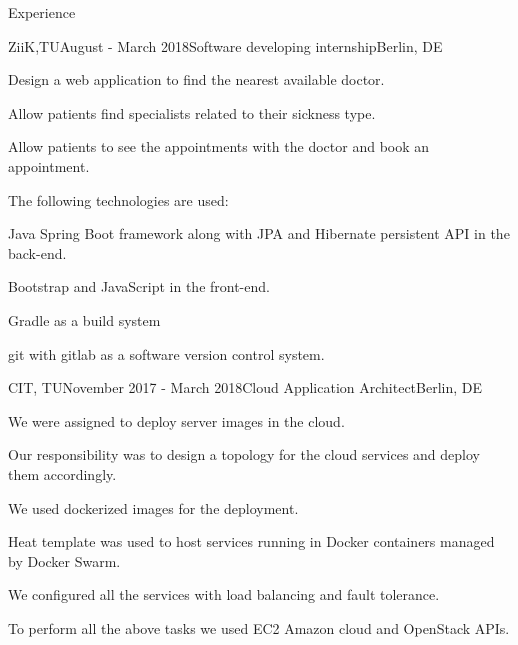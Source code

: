 \documentclass{resume} %
\begin{document}
\begin{rSection}{Experience}




\begin{rSubsection}{ZiiK,TU}{August  - March 2018}{Software developing internship}{Berlin, DE}
\item Design a web application to find the nearest available doctor.
\item Allow patients find specialists related to their sickness type.
\item Allow patients to see the appointments with the doctor and book an appointment.
\item The following technologies are used: 
\item Java Spring Boot framework along with JPA and Hibernate persistent API in the back-end.
\item Bootstrap and JavaScript in the front-end.
\item Gradle as a build system
\item git with gitlab as a software version control system.
\end{rSubsection}

\begin{rSubsection}{CIT, TU}{November 2017 - March 2018}{Cloud Application Architect}{Berlin, DE}
\item We were assigned to deploy server images in the cloud.
\item Our responsibility was to design a topology for the cloud services and deploy them accordingly.
\item We used dockerized images for the deployment. 
\item Heat  template was used to  host  services  running  in  Docker  containers managed  by  Docker  Swarm. 
\item We configured all the services with load balancing and fault tolerance.
\item To perform all the above tasks we used EC2 Amazon cloud and OpenStack APIs.
\end{rSubsection}



\end{rSection}
\end{document}
